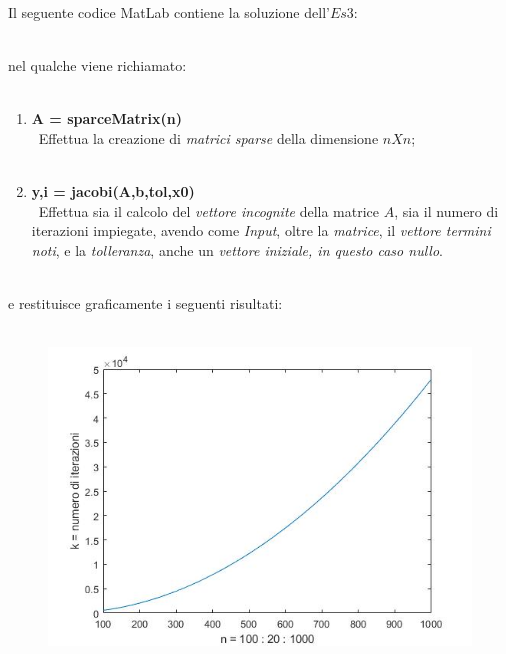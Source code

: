 Il seguente codice MatLab contiene la soluzione dell'$Es 3$:\\\
	
nel qualche viene richiamato:\\\
	\begin{enumerate}
		\item \textbf{A = sparceMatrix(n)}\\\
			Effettua la creazione di \textit{matrici sparse} della dimensione $nXn$;\\\
		\item \textbf{y,i = jacobi(A,b,tol,x0)}\\\
			Effettua sia il calcolo del \textit{vettore incognite} della matrice $A$, sia il numero di iterazioni impiegate, avendo come \textit{Input}, oltre la 	\textit{matrice}, il \textit{vettore termini noti}, e la \textit{tolleranza}, anche un \textit{vettore iniziale, in questo caso nullo}.\\\
			
	\end{enumerate}
e restituisce graficamente i seguenti risultati:\\\
	\begin{figure}[H]
		\includegraphics[width=\textwidth]{Plot/Cap_6_Es_3}
	\end{figure}